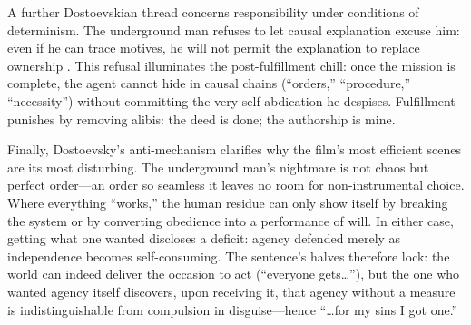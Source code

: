 A further Dostoevskian thread concerns responsibility under conditions of determinism. The
underground man refuses to let causal explanation excuse him: even if he can trace motives, he
will not permit the explanation to replace ownership \parencite[pp.~109--113]{DostoevskyNFU1994}.
This refusal illuminates the post-fulfillment chill: once the mission is complete, the agent
cannot hide in causal chains (``orders,'' ``procedure,'' ``necessity'') without committing the
very self-abdication he despises. Fulfillment punishes by removing alibis: the deed is done;
the authorship is mine.

Finally, Dostoevsky's anti-mechanism clarifies why the film's most efficient scenes are its most
disturbing. The underground man's nightmare is not chaos but perfect order—an order so seamless
it leaves no room for non-instrumental choice. Where everything ``works,'' the human residue can
only show itself by breaking the system or by converting obedience into a performance of will.
In either case, getting what one wanted discloses a deficit: agency defended merely as
independence becomes self-consuming. The sentence's halves therefore lock: the world can indeed
deliver the occasion to act (``everyone gets\ldots''), but the one who wanted agency itself
discovers, upon receiving it, that agency without a measure is indistinguishable from compulsion
in disguise—hence ``\ldots for my sins I got one.''
